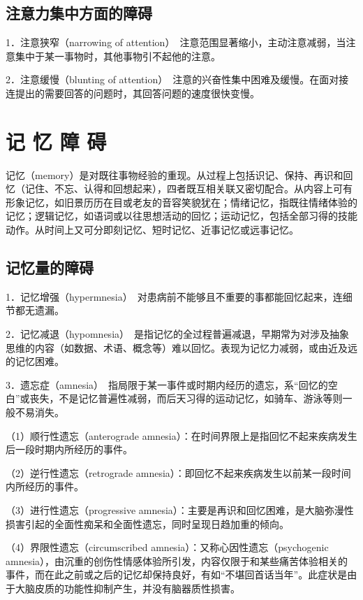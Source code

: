 \subsection{注意力集中方面的障碍}

1．注意狭窄（narrowing of
attention）　注意范围显著缩小，主动注意减弱，当注意集中于某一事物时，其他事物引不起他的注意。

2．注意缓慢（blunting of
attention）　注意的兴奋性集中困难及缓慢。在面对接连提出的需要回答的问题时，其回答问题的速度很快变慢。

\section{记 忆 障 碍}

记忆（memory）是对既往事物经验的重现。从过程上包括识记、保持、再识和回忆（记住、不忘、认得和回想起来），四者既互相关联又密切配合。从内容上可有形象记忆，如旧景历历在目或老友的音容笑貌犹在；情绪记忆，指既往情绪体验的记忆；逻辑记忆，如语词或以往思想活动的回忆；运动记忆，包括全部习得的技能动作。从时间上又可分即刻记忆、短时记忆、近事记忆或远事记忆。

\subsection{记忆量的障碍}

1．记忆增强（hypermnesia）　对患病前不能够且不重要的事都能回忆起来，连细节都无遗漏。

2．记忆减退（hypomnesia）　是指记忆的全过程普遍减退，早期常为对涉及抽象思维的内容（如数据、术语、概念等）难以回忆。表现为记忆力减弱，或由近及远的记忆困难。

3．遗忘症（amnesia）　指局限于某一事件或时期内经历的遗忘，系``回忆的空白''或丧失，不是记忆普遍性减弱，而后天习得的运动记忆，如骑车、游泳等则一般不易消失。

（1）顺行性遗忘（anterograde
amnesia）：在时间界限上是指回忆不起来疾病发生后一段时期内所经历的事件。

（2）逆行性遗忘（retrograde
amnesia）：即回忆不起来疾病发生以前某一段时间内所经历的事件。

（3）进行性遗忘（progressive
amnesia）：主要是再识和回忆困难，是大脑弥漫性损害引起的全面性痴呆和全面性遗忘，同时呈现日趋加重的倾向。

（4）界限性遗忘（circumscribed amnesia）：又称心因性遗忘（psychogenic
amnesia），由沉重的创伤性情感体验所引发，内容仅限于和某些痛苦体验相关的事件，而在此之前或之后的记忆却保持良好，有如``不堪回首话当年''。此症状是由于大脑皮质的功能性抑制产生，并没有脑器质性损害。

